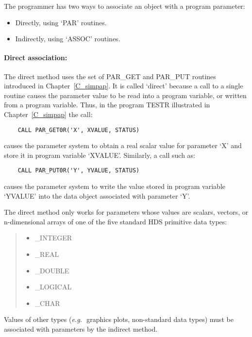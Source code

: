 The programmer has two ways to associate an object with a program parameter:
\begin{itemize}
\item Directly, using `PAR' routines.
\item Indirectly, using `ASSOC' routines.
\end{itemize}

\paragraph{Direct association:}\hfill

The direct method uses the set of PAR\_GET and PAR\_PUT routines introduced in
Chapter~\ref{C_simpap}.
It is called `direct' because a call to a single routine causes the parameter
value to be read into a program variable, or written from a program variable.
Thus, in the program TESTR illustrated in Chapter~\ref{C_simpap} the call:

\begin{small}
\begin{verbatim}
    CALL PAR_GET0R('X', XVALUE, STATUS)
\end{verbatim}
\end{small}

causes the parameter system to obtain a real scalar value for parameter `X' and
store it in program variable `XVALUE'.
Similarly, a call such as:

\begin{small}
\begin{verbatim}
    CALL PAR_PUT0R('Y', YVALUE, STATUS)
\end{verbatim}
\end{small}

causes the parameter system to write the value stored in program variable
`YVALUE' into the data object associated with parameter `Y'.

The direct method only works for parameters whose values are scalars, vectors,
or n-dimensional arrays of one of the five standard HDS primitive data types:
\begin{quote}
\begin{itemize}
\item \_INTEGER
\item \_REAL
\item \_DOUBLE
\item \_LOGICAL
\item \_CHAR
\end{itemize}
\end{quote}
Values of other types ({\em e.g.}\,\ graphics plots, non-standard data types)
must be associated with parameters by the indirect method.

